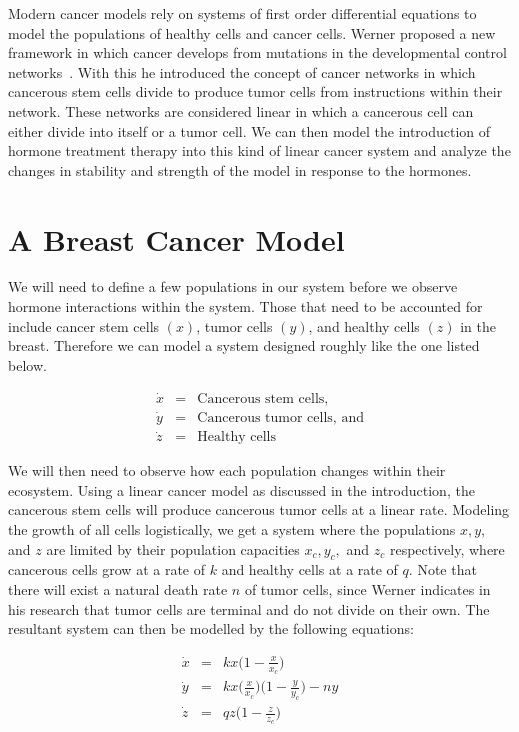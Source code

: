 \documentclass[12pt]{article}
\begin{document}
Modern cancer models rely on systems of first order differential equations to model the populations of healthy cells and cancer cells.  Werner proposed a new framework in which cancer develops from mutations in the developmental control networks~\cite{werner}.  With this he introduced the concept of cancer networks in which cancerous stem cells divide to produce tumor cells from instructions within their network.  These networks are considered linear in which a cancerous cell can either divide into itself or a tumor cell. We can then model the introduction of hormone treatment therapy into this kind of linear cancer system and analyze the changes in stability and strength of the model in response to the hormones.

\section{A Breast Cancer Model}
\indent\indent We will need to define a few populations in our system before we observe hormone interactions within the system.  Those that need to be accounted for include cancer stem cells $(x)$, tumor cells $(y)$, and healthy cells $(z)$ in the breast.  Therefore we can model a system designed roughly like the one listed below.

\begin{eqnarray*}
    \Dot{x} & = & \mbox{Cancerous stem cells,}\\
    \Dot{y} & = & \mbox{Cancerous tumor cells, and}\\
    \Dot{z} & = & \mbox{Healthy cells}
\end{eqnarray*}

We will then need to observe how each population changes within their ecosystem. Using a linear cancer model as discussed in the introduction, the cancerous stem cells will produce cancerous tumor cells at a linear rate.  Modeling the growth of all cells logistically, we get a system where the populations $x, y,$ and $z$ are limited by their population capacities $x_c, y_c, $ and $z_c$ respectively, where cancerous cells grow at a rate of $k$ and healthy cells at a rate of $q$.
\pagebreak 
Note that there will exist a natural death rate $n$ of tumor cells, since Werner indicates in his research that tumor cells are terminal and do not divide on their own. The resultant system can then be modelled by the following equations:

\begin{eqnarray*}
    \Dot{x} & = & kx\Big( 1-\frac{x}{x_c}\Big)\\
    \Dot{y} & = & kx\Big( \frac{x}{x_c}\Big)\Big( 1-\frac{y}{y_c}\Big) - ny\\
    \Dot{z} & = & qz\Big( 1-\frac{z}{z_c}\Big)
\end{eqnarray*}
\end{document}

